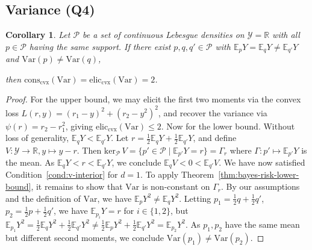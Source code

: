 \documentclass[11pt]{article} %
\newcommand{\Comments}{1}
\newcommand{\mytodo}[2]{\ifnum\Comments=1%
	\todo[linecolor=#1!80!black,backgroundcolor=#1,bordercolor=#1!80!black]{#2}\fi}
\newcommand{\btw}[1]{}%
\newcommand{\reals}{\mathbb{R}}
\newcommand{\eliccvx}{\mathrm{elic}_\mathrm{cvx}}
\newcommand{\conscvx}{\mathrm{cons}_\mathrm{cvx}}
\newcommand{\zeros}[1]{\mathrm{ker}_\P\,#1}
\newcommand{\E}{\mathbb{E}}
\renewcommand{\P}{\mathcal{P}}
\newcommand{\Y}{\mathcal{Y}}
\newcommand{\Var}{\mathrm{Var}}
\newtheorem{corollary}{Corollary}
\begin{document}
\subsection{Variance (Q4)}
\begin{corollary}
	\label{cor:variance}
	Let $\P$ be a set of continuous Lebesgue densities on $\Y=\reals$ with all $p \in \P$ having the same support.
	If there exist $p,q,q'\in\P$ with $\E_p Y = \E_q Y \neq \E_{q'} Y$ and $\Var(p) \neq \Var(q)$,
	\btw{Raf: I think this condition is tight actually: if there is no such triple in $\P$, I think $\eliccvx(\Var) \leq 1$ (i.e., $\Var$ is constant or a function of the mean)}
	then $\conscvx(\Var)=\eliccvx(\Var)=2$.
\end{corollary}
\begin{proof}
	For the upper bound, we may elicit the first two moments via the convex loss $L(r,y) = (r_1-y)^2 + (r_2-y^2)^2$, and recover the variance via $\psi(r) = r_2-r_1^2$, giving $\eliccvx(\Var) \leq 2$.
	Now for the lower bound.
	Without loss of generality, $\E_qY < \E_{q'}Y$.
	Let $r = \tfrac 1 2 \E_qY + \tfrac 1 2 \E_{q'}Y$, and define $V:\Y\to\reals, y\mapsto y-r$.
	Then $\zeros{V} = \{p'\in\P \mid \E_{p'}Y=r\} = \Gamma_r$ where $\Gamma:p'\mapsto \E_{p'}Y$ is the mean.
	As $\E_q Y < r < \E_{q'} Y$, we conclude $\E_q V < 0 < \E_{q'} V$.
	We have now satisfied Condition~\ref{cond:v-interior} for $d=1$.
	To apply Theorem~\ref{thm:bayes-risk-lower-bound}, it remains to show that $\Var$ is non-constant on $\Gamma_r$.
	By our assumptions and the definition of $\Var$, we have $\E_p Y^2 \neq \E_q Y^2$.
	Letting $p_1 = \tfrac 1 2 q + \tfrac 1 2 q'$, $p_2 = \tfrac 1 2 p + \tfrac 1 2 q'$, we have $\E_{p_i}Y = r$ for $i\in\{1,2\}$, but $\E_{p_1} Y^2 = \tfrac 1 2 \E_qY^2 + \tfrac 1 2 \E_{q'}Y^2 \neq \tfrac 1 2 \E_pY^2 + \tfrac 1 2 \E_{q'}Y^2 = \E_{p_2}Y^2$.
	As $p_1,p_2$ have the same mean but different second moments, we conclude $\Var(p_1) \neq \Var(p_2)$.
\end{proof}
\end{document}
